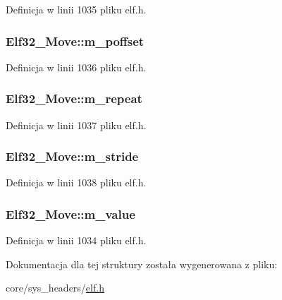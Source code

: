 Definicja w linii 1035 pliku elf.\-h.

\hypertarget{struct_elf32___move_a4b1119df05b7672effd0afb09b258f85}{
\subsubsection[{m\-\_\-poffset}]{ Elf32\-\_\-\-Move\-::m\-\_\-poffset}}\label{struct_elf32___move_a4b1119df05b7672effd0afb09b258f85}


Definicja w linii 1036 pliku elf.\-h.

\hypertarget{struct_elf32___move_a84620f9a22f6a4b0f8a8a6c4e332f600}{
\subsubsection[{m\-\_\-repeat}]{ Elf32\-\_\-\-Move\-::m\-\_\-repeat}}\label{struct_elf32___move_a84620f9a22f6a4b0f8a8a6c4e332f600}


Definicja w linii 1037 pliku elf.\-h.

\hypertarget{struct_elf32___move_a85ca12bb9ac30146a8533fccfe601b43}{
\subsubsection[{m\-\_\-stride}]{ Elf32\-\_\-\-Move\-::m\-\_\-stride}}\label{struct_elf32___move_a85ca12bb9ac30146a8533fccfe601b43}


Definicja w linii 1038 pliku elf.\-h.

\hypertarget{struct_elf32___move_ab9db1554472a8b54101e38298aabde19}{
\subsubsection[{m\-\_\-value}]{ Elf32\-\_\-\-Move\-::m\-\_\-value}}\label{struct_elf32___move_ab9db1554472a8b54101e38298aabde19}


Definicja w linii 1034 pliku elf.\-h.



Dokumentacja dla tej struktury została wygenerowana z pliku\-:\begin{DoxyCompactItemize}
\item 
core/sys\-\_\-headers/\hyperlink{elf_8h}{elf.\-h}\end{DoxyCompactItemize}
